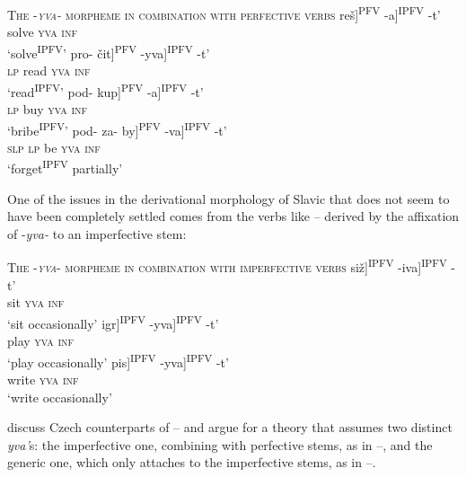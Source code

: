 \documentclass[output=paper,colorlinks,citecolor=brown]{langscibook}
\begin{document}
\ea   \textsc{The -\textit{yva-} morpheme in combination with perfective verbs}\label{tat:ex:15}
\ea \gll  \minsp{[[} reš]\textsuperscript{PFV} -a]\textsuperscript{IPFV} -t’   \\
 {} solve \textsc{yva} \textsc{inf}\\
 \glt ‘solve\textsuperscript{IPFV}’\label{ex:tatevosov:15a}
\ex \gll \minsp{[[} pro- čit]\textsuperscript{PFV} -yva]\textsuperscript{IPFV} -t’  \\ 
{} \textsc{lp} read \textsc{yva} \textsc{inf} \\
\glt ‘read\textsuperscript{IPFV}’\label{ex:tatevosov:15b}
\ex \gll \minsp{[} pod- kup]\textsuperscript{PFV} -a]\textsuperscript{IPFV} -t’\\
{} \textsc{lp} buy \textsc{yva} \textsc{inf} \\
\glt  ‘bribe\textsuperscript{IPFV}’\label{ex:tatevosov:15c}
\ex \gll   \minsp{[[} pod- za- by]\textsuperscript{PFV} -va]\textsuperscript{IPFV} -t’\\
{} \textsc{slp} \textsc{lp} be \textsc{yva} \textsc{inf}\\
\glt   ‘forget\textsuperscript{IPFV} partially’\label{ex:tatevosov:15d}
\z
\z

\noindent One of the issues in the derivational morphology of Slavic that does not seem to have been completely settled comes from the verbs like -- derived by the affixation of -\textit{yva-} to an imperfective stem:

\ea   \textsc{The -\textit{yva}- morpheme in combination with imperfective verbs}\label{tat:ex:16}
\ea \gll \minsp{[[} siž]\textsuperscript{IPFV} -iva]\textsuperscript{IPFV} -t’ \\
{} sit \textsc{yva} \textsc{inf} \\
\glt  ‘sit occasionally’\label{ex:tatevosov:16a}
\ex \gll \minsp{[[} igr]\textsuperscript{IPFV} -yva]\textsuperscript{IPFV} -t’ \\ 
{} play \textsc{yva} \textsc{inf} \\
\glt  ‘play occasionally’   \label{ex:tatevosov:16b}
\ex \minsp{[[} pis]\textsuperscript{IPFV} -yva]\textsuperscript{IPFV} -t’\\
{} write \textsc{yva} \textsc{inf} \\
\glt  ‘write occasionally’\label{ex:tatevosov:16c}
\z
\z 

\noindent \citet{Filip.Carlson1997} discuss Czech counterparts of -- and argue for a theory that assumes two distinct \textit{yva’}s: the imperfective one, combining with perfective stems, as in --,  and the generic one, which only attaches to the imperfective stems, as in --.
\end{document}
